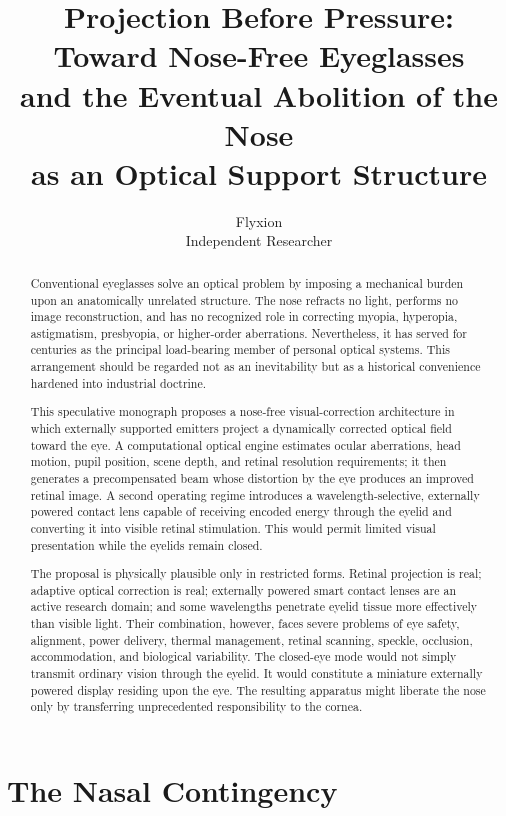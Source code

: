 \documentclass[11pt]{article}
\title{\textbf{Projection Before Pressure: Toward Nose-Free Eyeglasses \\ and the Eventual Abolition of the Nose \\ as an Optical Support Structure}}
\author{Flyxion \\ \small Independent Researcher}
\date{}
\begin{document}
\maketitle

\begin{abstract}
\noindent Conventional eyeglasses solve an optical problem by imposing a mechanical burden upon an anatomically unrelated structure. The nose refracts no light, performs no image reconstruction, and has no recognized role in correcting myopia, hyperopia, astigmatism, presbyopia, or higher-order aberrations. Nevertheless, it has served for centuries as the principal load-bearing member of personal optical systems. This arrangement should be regarded not as an inevitability but as a historical convenience hardened into industrial doctrine.

This speculative monograph proposes a nose-free visual-correction architecture in which externally supported emitters project a dynamically corrected optical field toward the eye. A computational optical engine estimates ocular aberrations, head motion, pupil position, scene depth, and retinal resolution requirements; it then generates a precompensated beam whose distortion by the eye produces an improved retinal image. A second operating regime introduces a wavelength-selective, externally powered contact lens capable of receiving encoded energy through the eyelid and converting it into visible retinal stimulation. This would permit limited visual presentation while the eyelids remain closed.

The proposal is physically plausible only in restricted forms. Retinal projection is real; adaptive optical correction is real; externally powered smart contact lenses are an active research domain; and some wavelengths penetrate eyelid tissue more effectively than visible light. Their combination, however, faces severe problems of eye safety, alignment, power delivery, thermal management, retinal scanning, speckle, occlusion, accommodation, and biological variability. The closed-eye mode would not simply transmit ordinary vision through the eyelid. It would constitute a miniature externally powered display residing upon the eye. The resulting apparatus might liberate the nose only by transferring unprecedented responsibility to the cornea.
\end{abstract}

\section{The Nasal Contingency}
\end{document}
